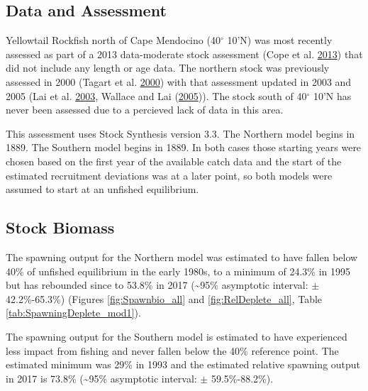 \documentclass[12pt,]{article}
\begin{document}
\FloatBarrier

\newpage

\subsection*{Data and Assessment}\label{data-and-assessment}

Yellowtail Rockfish north of Cape Mendocino (40\(^\circ\) 10'N) was most
recently assessed as part of a 2013 data-moderate stock assessment (Cope
et al. \protect\hyperlink{ref-Cope2013}{2013}) that did not include any
length or age data. The northern stock was previously assessed in 2000
(Tagart et al. \protect\hyperlink{ref-Tagart2000}{2000}) with that
assessment updated in 2003 and 2005 (Lai et al.
\protect\hyperlink{ref-Lai2003}{2003}, Wallace and Lai
(\protect\hyperlink{ref-Wallace2005}{2005})). The stock south of
40\(^\circ\) 10'N has never been assessed due to a percieved lack of
data in this area.

This assessment uses Stock Synthesis version 3.3. The Northern model
begins in 1889. The Southern model begins in 1889. In both cases those
starting years were chosen based on the first year of the available
catch data and the start of the estimated recruitment deviations was at
a later point, so both models were assumed to start at an unfished
equilibrium.

\subsection*{Stock Biomass}\label{stock-biomass}

The spawning output for the Northern model was estimated to have fallen
below 40\% of unfished equilibrium in the early 1980s, to a minimum of
24.3\% in 1995 but has rebounded since to 53.8\% in 2017
(\textasciitilde{}95\% asymptotic interval: \(\pm\) 42.2\%-65.3\%)
(Figures \ref{fig:Spawnbio_all} and \ref{fig:RelDeplete_all}, Table
\ref{tab:SpawningDeplete_mod1}).

The spawning output for the Southern model is estimated to have
experienced less impact from fishing and never fallen below the 40\%
reference point. The estimated minimum was 29\% in 1993 and the
estimated relative spawning output in 2017 is 73.8\%
(\textasciitilde{}95\% asymptotic interval: \(\pm\) 59.5\%-88.2\%).

\FloatBarrier
\end{document}
